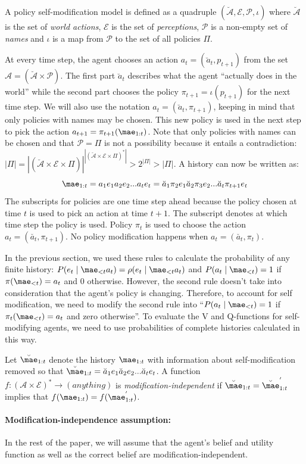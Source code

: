 	\begin{definition}
		A policy self-modification model is defined as a quadruple $(\breve{\mathcal{A}}, \mathcal{E, P}, \iota)$ where $\breve{\mathcal{A}}$ is the set of \textit{world actions}, $\mathcal{E}$ is the set of \textit{perceptions}, $\mathcal{P}$ is a non-empty set of \textit{names} and $\iota$ is a map from $\mathcal{P}$  to the set of all policies $\Pi$. 
	\end{definition}
	At every time step, the agent chooses an action $a_t = (\breve{a}_t, p_{t+1}
	)$ from the set $\mathcal{A} = (\breve{\mathcal{A}} \times \mathcal{P})$. The first part $\breve{a}_t$ describes what the agent ``actually does in the world'' while the second part chooses the policy $\pi_{t+1}=\iota(p_{t+1})$ for the next time step. We will also use the notation  $a_t = (\breve{a}_t, \pi_{t+1}
	)$, keeping in mind that only policies with names may be chosen. This new policy is used in the next step to pick the action $a_{t+1}=\pi_{t+1}(\mae_{1:t})$. Note that only policies with names can be chosen and that $\mathcal{P} = \Pi$ is not a possibility because it entails a contradiction: 
	$ |\Pi| = |(\breve{\mathcal{A}} \times \mathcal{E}\times \Pi)|^{|(\breve{\mathcal{A}} \times \mathcal{E}\times \Pi)^*|} > 2^{|\Pi|}>|\Pi|$. A history can now be written as:
	\[\mae_{1:t} = a_1 e_1 a_2 e_2 ... a_t e_t = \breve{a}_1 \pi_2 e_1 \breve{a}_2 \pi_3 e_2 ... \breve{a}_t \pi_{t+1} e_t \]
	The subscripts for policies are one time step ahead because the policy chosen at time $t$ is used to pick an action at time $t+1$. The subscript denotes at which time step the policy is used. Policy $\pi_t$ is used to choose the action $a_t = (\breve{a_t}, \pi_{t+1})$. No policy modification happens when $a_t = (\breve{a_t}, \pi_t)$.

	In the previous section, we used these rules to calculate the probability of any finite history: $P(e_t \mid \mae_{< t}a_t) = \rho(e_t \mid \mae_{< t}a_t)$  and $P(a_t \mid \mae_{< t}) = 1$ if $\pi(\mae_{<t})=a_t$ and 0 otherwise. However, the second rule doesn't take into consideration that the agent's policy is changing. Therefore, to account for self modification, we need to modify the second rule into ``$P(a_t\mid \mae_{< t}) = 1$ if $\pi_t(\mae_{<t})=a_t$ and zero otherwise''.  To evaluate the V and Q-functions for self-modifying agents, we need to use probabilities of complete histories calculated in this way.
	
	\begin{definition} \label{def:mod_indep}
		Let $\breve{\mae}_{1:t}$ denote the history $\mae_{1:t}$ with information about self-modification removed so that $\breve{\mae}_{1:t}=\breve{a}_1 e_1\breve{a}_2 e_2 ... \breve{a}_{t} e_t$. A function $ f \colon (\mathcal{A \times E})^* \to (anything)$ is \textit{modification-independent} if $\breve{\mae}_{1:t}=\breve{\mae}_{1:t}^{'}$ implies that $f(\mae_{1:t})=f(\mae_{1:t}^{'})$.
	\end{definition}

\paragraph{Modification-independence assumption:}In the rest of the paper, we will assume that the agent's belief and utility function as well as the correct belief are modification-independent.
